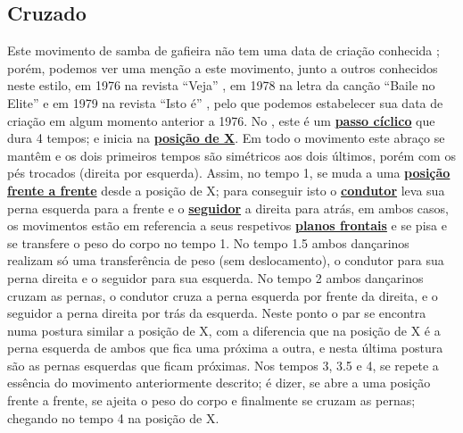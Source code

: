 \subsection{Cruzado}

Este movimento de samba de gafieira não tem uma data de criação conhecida \cite[pp. 143]{perna2002samba};
porém, podemos ver uma menção a este movimento, junto a outros conhecidos neste estilo,
em 1976 na revista ``Veja'' \cite[pp. 158]{1976veja},
em 1978 na letra da canção ``Baile no Elite'' \cite{BaileNoElite}  e 
em 1979 na revista ``Isto é'' \cite[pp. 89]{revista1979isto},
pelo que podemos estabelecer sua data de criação em algum momento anterior a 1976.
No \AnoLivro, este é um \hyperref[def:PassoCiclico]{\textbf{passo cíclico}} que dura 4 tempos;
e inicia na \hyperref[def:X-position]{\textbf{posição de X}}.
Em todo o movimento este abraço se mantêm e os dois primeiros tempos 
são simétricos aos dois últimos, porém com os pés trocados (direita por esquerda). 
Assim, no tempo 1, 
se muda a uma \hyperref[def:frente-frente-position]{\textbf{posição frente a frente}} desde a posição de X;
para conseguir isto o \hyperref[def:Condutor]{\textbf{condutor}} 
leva sua perna esquerda para a frente e o \hyperref[def:Seguidor]{\textbf{seguidor}}  a direita para atrás,
em ambos casos, os movimentos estão em referencia a seus 
respetivos \hyperref[def:PlanoFrontal]{\textbf{planos frontais}} e 
se pisa e se transfere o peso do corpo no tempo 1.
No tempo 1.5 ambos dançarinos realizam só uma transferência de peso (sem deslocamento),
o condutor para sua perna direita e o seguidor para sua esquerda.
No tempo 2 ambos dançarinos cruzam as pernas, 
o condutor cruza a perna esquerda por frente da direita, e o seguidor a perna direita por trás da esquerda.
Neste ponto o par se encontra numa postura similar a posição de X, 
com a diferencia que na posição de X é a perna esquerda de ambos que fica uma próxima a outra,
e nesta última postura são as pernas esquerdas que ficam próximas.
Nos tempos 3, 3.5 e 4, se repete a essência do movimento anteriormente descrito;
é dizer, se abre a uma posição frente a frente, se ajeita o peso do corpo e finalmente se cruzam as pernas;
chegando no tempo 4 na posição de X.



